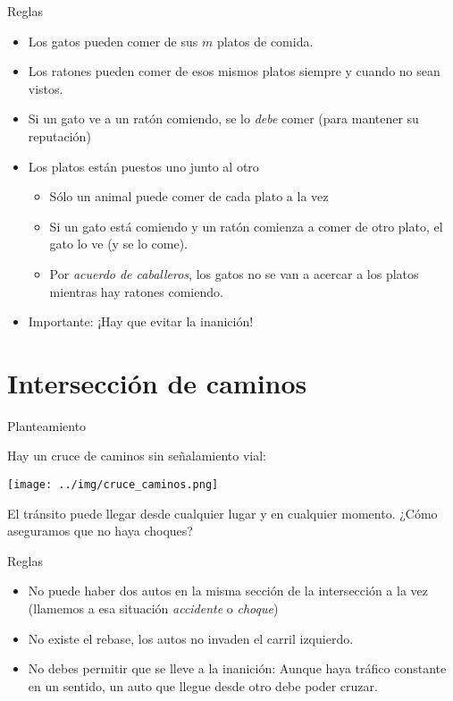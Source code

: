 \documentclass[presentation]{beamer}
\begin{document}
\begin{frame}[label={sec:orgd9a2693}]{Reglas}
\begin{itemize}
\item Los gatos pueden comer de sus \(m\) platos de comida.
\item Los ratones pueden comer de esos mismos platos siempre y cuando no
sean vistos.
\item Si un gato ve a un ratón comiendo, se lo \emph{debe} comer (para
mantener su reputación)
\end{itemize}
\begin{itemize}
\item Los platos están puestos uno junto al otro
\begin{itemize}
\item Sólo un animal puede comer de cada plato a la vez
\item Si un gato está comiendo y un ratón comienza a comer de otro
plato, el gato lo ve (y se lo come).
\item Por \emph{acuerdo de caballeros}, los gatos no se van a acercar a los
platos mientras hay ratones comiendo.
\end{itemize}
\item Importante: ¡Hay que evitar la inanición!
\end{itemize}
\end{frame}

\section{Intersección de caminos}
\label{sec:org87fa391}
\begin{frame}[label={sec:orgada327c}]{Planteamiento}
\begin{center}
Hay un cruce de caminos sin señalamiento vial:

\begin{center}
\texttt{[image: ../img/cruce\_caminos.png]}
\end{center}

El tránsito puede llegar desde cualquier lugar y en cualquier
momento. ¿Cómo aseguramos que no haya choques?
\end{center}
\end{frame}

\begin{frame}[label={sec:orgd81ac98}]{Reglas}
\begin{itemize}
\item No puede haber dos autos en la misma sección de la intersección a la
vez (llamemos a esa situación \emph{accidente} o \emph{choque})
\item No existe el rebase, los autos no invaden el carril izquierdo.
\item No debes permitir que se lleve a la inanición: Aunque haya tráfico
constante en un sentido, un auto que llegue desde otro debe poder
cruzar.
\end{itemize}
\end{frame}
\end{document}

